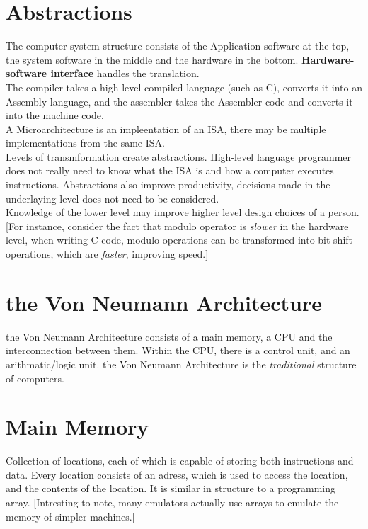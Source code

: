 \documentclass[11pt,a4paper,twocolumn]{book}
\begin{document}
\section{Abstractions}

The computer system structure consists of the Application software at the top, the system software in the middle and the hardware in the bottom. \textbf{Hardware-software interface} handles the translation.\\

The compiler takes a high level compiled language (such as C), converts it into an Assembly language, and the assembler takes the Assembler code and converts it into the machine code.\\

A Microarchitecture is an impleentation of an ISA, there may be multiple implementations from the same ISA.\\

Levels of transmformation create abstractions. High-level language programmer does not really need to know what the ISA is and how a computer executes instructions. Abstractions also improve productivity, decisions made in the underlaying level does not need to be considered.\\

Knowledge of the lower level may improve higher level design choices of a person. [For instance, consider the fact that modulo operator is \textit{slower} in the hardware level, when writing C code, modulo operations can be transformed into bit-shift operations, which are \textit{faster}, improving speed.]

\section{the Von Neumann Architecture}

the Von Neumann Architecture consists of a main memory, a CPU and the interconnection between them. Within the CPU, there is a control unit, and an arithmatic/logic unit. the Von Neumann Architecture is the \textit{traditional} structure of computers.\\

\section{Main Memory}

Collection of locations, each of which is capable of storing both instructions and data. Every location consists of an adress, which is used to access the location, and the contents of the location. It is similar in structure to a programming array. [Intresting to note, many emulators actually use arrays to emulate the memory of simpler machines.]
\end{document}
